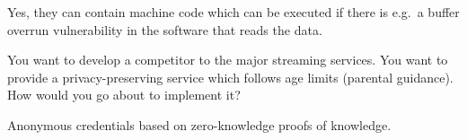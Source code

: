 \begin{frame}
  \begin{solution}
    Yes, they can contain machine code which can be executed if there is e.g.\ 
    a buffer overrun vulnerability in the software that reads the data.
  \end{solution}
\end{frame}



\begin{frame}
  \begin{exercise}
    You want to develop a competitor to the major streaming services.
    You want to provide a privacy-preserving service which follows age limits 
    (parental guidance).
    How would you go about to implement it?
  \end{exercise}
\end{frame}

\begin{frame}
  \begin{solution}
    Anonymous credentials based on zero-knowledge proofs of knowledge.
  \end{solution}
\end{frame}


